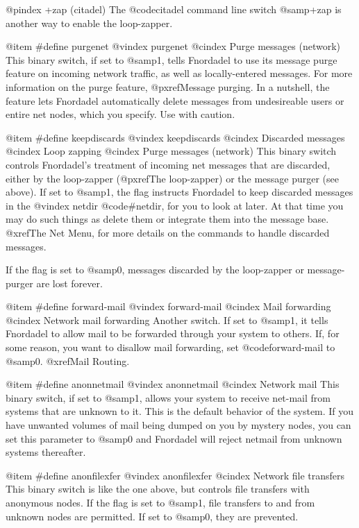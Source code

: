 @pindex +zap (citadel)
The @code{citadel} command line switch @samp{+zap} is
another way to enable the loop-zapper.

@item #define purgenet
@vindex purgenet
@cindex Purge messages (network)
This binary switch, if set to @samp{1}, tells Fnordadel to use its
message purge feature on incoming network traffic, as well
as locally-entered messages.  For more information on the
purge feature, @pxref{Message purging}.  In a nutshell, the feature
lets Fnordadel automatically delete messages from undesireable
users or entire net nodes, which you specify.  Use with caution.

@item #define keepdiscards
@vindex keepdiscards
@cindex Discarded messages
@cindex Loop zapping
@cindex Purge messages (network)
This binary switch controls Fnordadel's treatment
of incoming net messages that are discarded, either by the
loop-zapper (@pxref{The loop-zapper}) or the message purger (see
above).  If set to @samp{1}, the flag instructs Fnordadel to keep
discarded messages in the
@vindex netdir
@code{#netdir}, for you to look at later.
At that time you may do such things as delete them or integrate
them into the message base.  @xref{The Net Menu}, for more
details on the commands to handle discarded messages.

If the flag is set to @samp{0}, messages discarded by the
loop-zapper or message-purger are lost forever.

@item #define forward-mail
@vindex forward-mail
@cindex Mail forwarding
@cindex Network mail forwarding
Another switch.  If set to @samp{1}, it tells Fnordadel
to allow mail to be forwarded through your system to
others.  If, for some reason, you want to disallow mail
forwarding, set @code{forward-mail} to @samp{0}.  @xref{Mail Routing}.

@item #define anonnetmail
@vindex anonnetmail
@cindex Network mail
This binary switch, if set to @samp{1}, allows your system to
receive net-mail from systems that are unknown to it.  This is
the default behavior of the system.  If you have unwanted
volumes of mail being dumped on you by mystery nodes, you can
set this parameter to @samp{0} and Fnordadel will reject netmail from unknown
systems thereafter.

@item #define anonfilexfer
@vindex anonfilexfer
@cindex Network file transfers
This binary switch is like the one above, but controls
file transfers with anonymous nodes.  If the flag is set to
@samp{1}, file transfers to and from unknown nodes are permitted.  If
set to @samp{0}, they are prevented.

